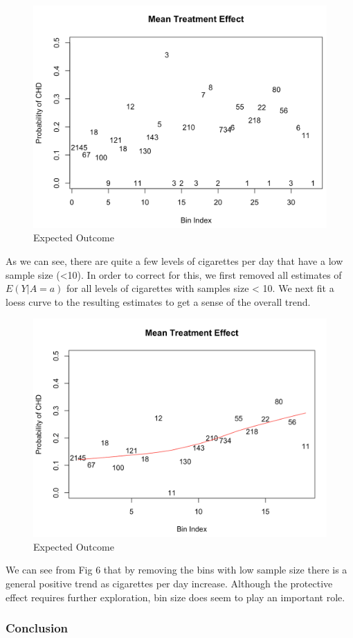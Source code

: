 \documentclass[]{article}
\begin{document}
\begin{figure}[H]

{\centering \includegraphics[width=0.5\linewidth]{./effect} 

}

\caption{Expected Outcome}\label{fig:fig5}
\end{figure}

As we can see, there are quite a few levels of cigarettes per day that
have a low sample size (\textless{}10). In order to correct for this, we
first removed all estimates of \(E(Y | A=a )\) for all levels of
cigarettes with samples size \textless{} 10. We next fit a loess curve
to the resulting estimates to get a sense of the overall trend.

\begin{figure}[H]

{\centering \includegraphics[width=0.5\linewidth]{./pos_violation2} 

}

\caption{Expected Outcome}\label{fig:fig6}
\end{figure}

We can see from Fig 6 that by removing the bins with low sample size
there is a general positive trend as cigarettes per day increase.
Although the protective effect requires further exploration, bin size
does seem to play an important role.

\subsubsection{Conclusion}\label{conclusion}
\end{document}

